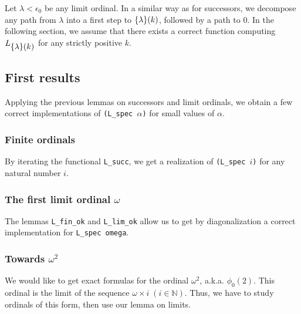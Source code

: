 Let $\lambda<\epsilon_0$ be any limit ordinal. In a similar way as for successors, we decompose any path from $\lambda$  into a first step to
$\mbox{$\{\lambda\}(k)$}$, followed by a path to $0$. In the following section, we assume that there exists a correct function computing  $L_{\mbox{$\{\lambda\}(k)$}}$ for any strictly positive $k$.




\subsection{First results}

Applying the previous lemmas on successors and limit ordinals, 
we obtain a few  correct implementations of \texttt{(L\_spec $\alpha$)} for small values of $\alpha$.

\subsubsection{Finite ordinals}

By iterating the functional \texttt{L\_succ}, we get a realization of
\texttt{(L\_spec $i$)} for any natural number $i$. 


\vspace{-16pt}


\subsubsection{The first limit ordinal  \texorpdfstring{$\omega$}{omega}}

The lemmas \texttt{L\_fin\_ok} and \texttt{L\_lim\_ok}   allow us to get 
by diagonalization a correct implementation for 
\texttt{L\_spec omega}.


\vspace{-16pt}


\subsubsection{Towards  \texorpdfstring{$\omega^2$}{omega*omega}}

We would like to get exact formulas for the ordinal $\omega^2$, a.k.a.
$\phi_0(2)$. This ordinal is the limit of the sequence $\omega\times i\;(i \in \mathbb{N})$. Thus, we have to study ordinals of this form, then use 
our lemma on limits.


